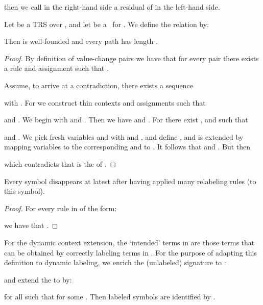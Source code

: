 then we call  in the right-hand side
a residual of  in the left-hand side.

\newcommand{\reachrel}{\leadsto}
\newcommand{\srelabelw}{w}
\newcommand{\relabelw}{\funap{\srelabelw}}
\begin{lemma}\label{lem:relabel:bound}
  Let  be a TRS over , 
  and let  be a \clabeling\ for .
  We define the relation  by:
  
  Then  is well-founded and every  path has length .
\end{lemma}
\begin{proof}
  By definition of value-change pairs we have that for every pair 
  there exists a rule  and assignment 
  such that .
  
  Assume, to arrive at a contradiction, there exists a sequence 
  
  with .
  For  we construct thin contexts  
  and assignments  
  such that 
  
  and .
  We begin with  and .
  Then we have  and .
  For  there exist
  , and 
  such that
  
  and .
  We pick fresh variables  and 
  with  and ,
  and define ,
  and  is  extended by
  mapping variables  to the corresponding  and  to .
  It follows that 
  and .
  But then
  
  which contradicts that  is the \cdepth{} of .
\end{proof}



\begin{corollary}
  Every  symbol disappears at latest 
  after having applied  many 
  relabeling rules (to this symbol).
\end{corollary}
\begin{proof}
  For every rule in  of the form:
  
  we have that .
\end{proof}

For the dynamic context extension, the `intended' terms in 
are those terms that can be obtained by correctly labeling terms in .
For the purpose of adapting this definition to dynamic labeling,
we enrich the (unlabeled) signature  to :

and extend the \clabeling{} to  by:

for all  such that  for some .
Then labeled symbols are identified by .



